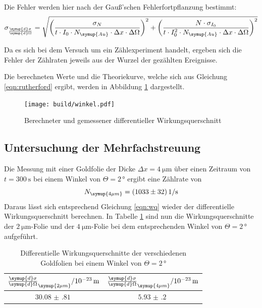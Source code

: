 Die Fehler werden hier nach der Gauß'schen Fehlerfortpflanzung bestimmt:
\begin{equation*}
  \sigma_{\frac{\symup{d}\sigma}{\symup{d}\Omega}} = \sqrt{\left(\frac{\sigma_N}{t \cdot I_0 \cdot N_\symup{Au} \cdot \Delta x \cdot \Delta \Omega}\right)^2
  + \left(\frac{N \cdot \sigma_{I_0}}{t \cdot I_0^2 \cdot N_\symup{Au} \cdot \Delta x \cdot \Delta \Omega}\right)^2}
\end{equation*}

Da es sich bei dem Versuch um ein Zählexperiment handelt, ergeben sich die Fehler der Zählraten jeweils aus der Wurzel der gezählten Ereignisse.

Die berechneten Werte und die Theoriekurve, welche sich aus Gleichung \ref{eqn:rutherford} ergibt, werden in Abbildung \ref{fig:wirkungsquerschnitt} dargestellt.

\begin{figure}[H]
  \centering
  \texttt{[image: build/winkel.pdf]}
  \caption{Berechneter und gemessener differentieller Wirkungsquerschnitt}
  \label{fig:wirkungsquerschnitt}
\end{figure}



\subsection{Untersuchung der Mehrfachstreuung}
Die Messung mit einer Goldfolie der Dicke $\Delta x = \SI{4}{\micro\meter}$ über einen
Zeitraum von $t = \SI{300}{\second}$ bei einem Winkel von $\Theta = 2 \, °$ ergibt
eine Zählrate von
\begin{equation*}
  N_\symup{4\mu m} = \SI{1033(32)}{1\per\second}
\end{equation*}
Daraus lässt sich entsprechend Gleichung \ref{eqn:wq} wieder der differentielle Wirkungsquerschnitt
berechnen. In Tabelle \ref{tab:wq} sind nun die Wirkungsquerschnitte der $\SI{2}{\micro\meter}$-Folie
und der $\SI{4}{\micro\meter}$-Folie bei dem entsprechenden Winkel von $\Theta = 2 \, °$ aufgeführt.
\begin{table}[H]
  \centering
  \caption{Differentielle Wirkungsquerschnitte der verschiedenen Goldfolien bei einem Winkel von $\Theta = 2 \, °$}
  \label{tab:wq}
  \begin{tabular}{c c}
    \toprule
    $\frac{\symup{d}\sigma}{\symup{d}\Omega}_\symup{2\mu m} /  10^{-23}\, \mathrm{m}$ & $\frac{\symup{d}\sigma}{\symup{d}\Omega}_\symup{4\mu m}/ 10^{-23}\, \mathrm{m}$ \\
    \midrule
    $\SI{30.08(81)}{}$ & $\SI{5.93(20)}{}$  \\
    \bottomrule
  \end{tabular}
\end{table}


